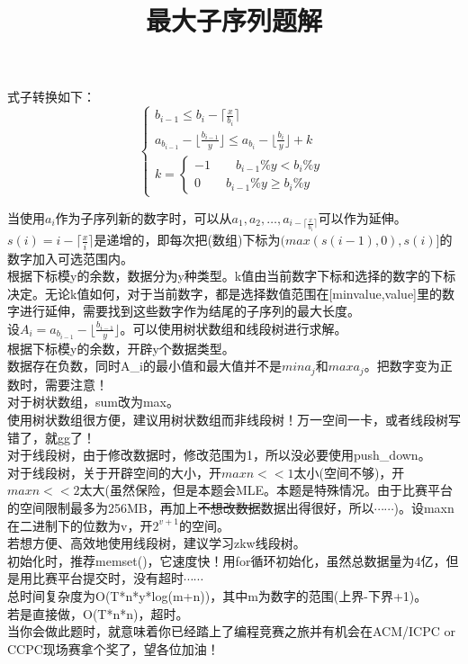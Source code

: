 \documentclass{article}
\date{}
\title{最大子序列题解}
\begin{document}
		\maketitle \vspace{-50pt}
		
	\indent 式子转换如下：\\
\begin{equation}\nonumber
	\left\{
	\begin{aligned}
		b_{i-1}	\le b_{i} - \lceil \frac{x}{b_{i}} \rceil \\
		a_{b_{i-1}} - \lfloor \frac{b_{i-1}}{y} \rfloor \le  a_{b_{i}} - \lfloor \frac{b_{i}}{y} \rfloor +k \\
		k=
    \left\{
	    \begin{aligned}
	    -1	\qquad b_{i-1}\%y<b_{i}\%y\\
	    0	\qquad b_{i-1}\%y \ge b_{i}\%y
		\end{aligned}
	\right.
	\end{aligned}
	\right.
\end{equation}

	\indent 当使用$a_{i}$作为子序列新的数字时，可以从$a_{1},a_{2},\dots,a_{i-\lceil \frac{x}{b_{i}} \rceil}$可以作为延伸。$s(i)=i - \lceil \frac{x}{i} \rceil$是递增的，即每次把(数组)下标为$(max(s(i-1),0),s(i)]$的数字加入可选范围内。\\
	\indent 根据下标模y的余数，数据分为y种类型。k值由当前数字下标和选择的数字的下标决定。无论k值如何，对于当前数字，都是选择数值范围在[minvalue,value]里的数字进行延伸，需要找到这些数字作为结尾的子序列的最大长度。\\
	\indent 设$A_{i}=a_{b_{i-1}} - \lfloor \frac{b_{i-1}}{y} \rfloor$。可以使用树状数组和线段树进行求解。\\
	\indent 根据下标模y的余数，开辟y个数据类型。\\
	\indent 数据存在负数，同时A_{i}的最小值和最大值并不是$min{a_{j}}$和$max{a_{j}}$。把数字变为正数时，需要注意！\\
	\indent 对于树状数组，sum改为max。\\
	\indent 使用树状数组很方便，建议用树状数组而非线段树！万一空间一卡，或者线段树写错了，就gg了！\\
	\indent 对于线段树，由于修改数据时，修改范围为1，所以没必要使用push_down。\\
	\indent 对于线段树，关于开辟空间的大小，开$maxn<<1$太小(空间不够)，开$maxn<<2$太大(虽然保险，但是本题会MLE。本题是特殊情况。由于比赛平台的空间限制最多为256MB，再加上\sout{不想改数据}数据出得很好，所以$\cdots \cdots$)。设maxn在二进制下的位数为v，开$2^{v+1}$的空间。\\
	\indent 若想方便、高效地使用线段树，建议学习zkw线段树。\\
	\indent 初始化时，推荐memset()，它速度快！用for循环初始化，虽然总数据量为4亿，但是用比赛平台提交时，没有超时$\cdots \cdots$\\
	\indent 总时间复杂度为O(T*n*y*log(m+n))，其中m为数字的范围(上界-下界+1)。\\
	\indent 若是直接做，O(T*n*n)，超时。\\
	\indent 当你会做此题时，就意味着你已经踏上了编程竞赛之旅并有机会在ACM/ICPC or CCPC现场赛拿个奖了，望各位加油！
	
\end{document}
